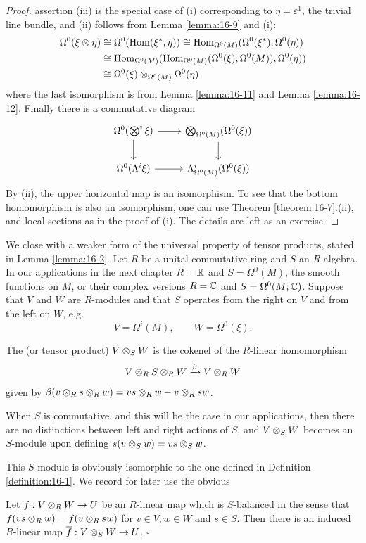 \begin{proof}
  assertion (iii) is the special case of (i) corresponding to $\eta=\varepsilon^1$, the trivial line bundle, 
  and (ii) follows from Lemma \ref{lemma:16-9} and (i):
  \begin{align*}
    \Omega^0(\xi\otimes\eta)
    & \simee \Omega^0(\hom(\xi^*, \eta)) 
      \simee \hom_{\Omega^0(M)}(\Omega^0(\xi^*), \Omega^0(\eta)) \\
    & \simee \hom_{\Omega^0(M)}(\hom_{\Omega^0(M)}(\Omega^0(\xi), \Omega^0(M)), \Omega^0(\eta))\\
    & \simee \Omega^0(\xi)\otimes_{\Omega^0(M)}\Omega^0(\eta)
  \end{align*}
  where the last isomorphism is from Lemma \ref{lemma:16-11} and Lemma \ref{lemma:16-12}. Finally there 
  is a commutative diagram
  \[\begin{tikzcd}
    \Omega^0(\bigotimes^i\xi)\dar{}\rar{} & \bigotimes_{\Omega^0(M)}(\Omega^0(\xi))\dar{} \\
    \Omega^0(\Lambda^i\xi)\rar{} & \Lambda^i_{\Omega^0(M)}(\Omega^0(\xi))
  \end{tikzcd}\]
  By (ii), the upper horizontal map is an isomorphism. To see that the bottom
  homomorphism is also an isomorphism, one can use Theorem \ref{theorem:16-7}.(ii), and local
  sections as in the proof of (i). The details are left as an exercise.
\end{proof}

We close with a weaker form of the universal property of tensor products, stated
in Lemma \ref{lemma:16-2}. Let $R$ be a unital commutative ring and $S$ an $R$-algebra. In our
applications in the next chapter $R = \RR$ and $S = \Omega^0(M)$, the smooth functions
on $M$, or their complex versions $R = \CC$ and $S = \Omega^0(M; \CC)$. Suppose that $V$
and $W$ are $R$-modules and that $S$ operates from the right on $V$ and from the
left on $W$, e.g.
\[
  V = \Omega^i(M), \qquad W = \Omega^0(\xi).
\]

\begin{definition}\label{definition:16-14}
  The  (or tensor product) $V\otr[S] W$ is the cokenel of the $R$-linear homomorphism
  \[
    V\otr S\otr W \xra[\beta] V\otr W
  \]
  given by $\beta(v\otr s\otr w) = vs\otr w - v\otr sw$.
\end{definition}

When $S$ is commutative, and this will be the case in our applications, then there
are no distinctions between left and right actions of $S$, and $V\otr[S] W$ becomes an
$S$-module upon defining $s(v\otr[S] w) = vs\otr[S] w$.


This $S$-module is obviously isomorphic to the one defined in Definition \ref{definition:16-1}. We
record for later use the obvious
\begin{lemma}\label{lemma:16-15}
  Let $f:V\otr W\to U$ be an $R$-linear map which is $S$-balanced in the sense that $f(vs\otr w)=f(v\otr sw)$ 
  for $v\in V, w\in W$ and $s\in S$. Then there is an induced $R$-linear map $\overline{f}:V\otr[S] W\to U$.
  \hfill $\square$
\end{lemma}
